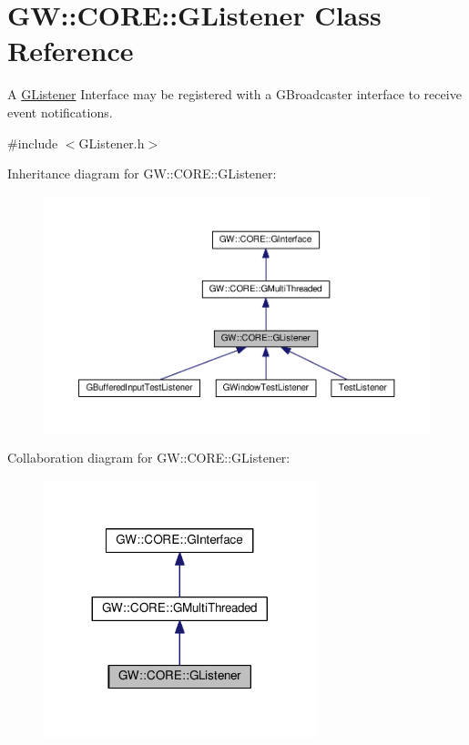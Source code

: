 \hypertarget{classGW_1_1CORE_1_1GListener}{}\section{GW\+:\+:C\+O\+RE\+:\+:G\+Listener Class Reference}
\label{classGW_1_1CORE_1_1GListener}


A \hyperlink{classGW_1_1CORE_1_1GListener}{G\+Listener} Interface may be registered with a G\+Broadcaster interface to receive event notifications.  




{\ttfamily \#include $<$G\+Listener.\+h$>$}



Inheritance diagram for GW\+:\+:C\+O\+RE\+:\+:G\+Listener\+:
\nopagebreak
\begin{figure}[H]
\begin{center}
\leavevmode
\includegraphics[width=350pt]{classGW_1_1CORE_1_1GListener__inherit__graph}
\end{center}
\end{figure}


Collaboration diagram for GW\+:\+:C\+O\+RE\+:\+:G\+Listener\+:
\nopagebreak
\begin{figure}[H]
\begin{center}
\leavevmode
\includegraphics[width=224pt]{classGW_1_1CORE_1_1GListener__coll__graph}
\end{center}
\end{figure}
